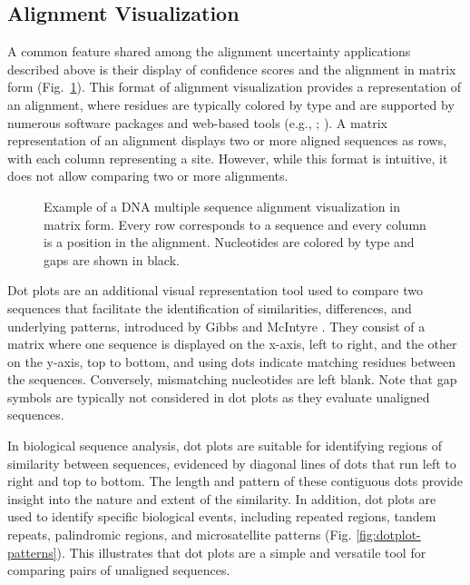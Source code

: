 \subsection{Alignment Visualization}

A common feature shared among the alignment uncertainty applications described above is their display of confidence scores and the alignment in matrix form (Fig.~\ref{fig:msa-example}). This format of alignment visualization provides a representation of an alignment, where residues are typically colored by type and are supported by numerous software packages and web-based tools (e.g., \citealp{zhou2022ggmsa}; \citealp{yachdav2016msaviewer}). A matrix representation of an alignment displays two or more aligned sequences as rows, with each column representing a site. However, while this format is intuitive, it does not allow comparing two or more alignments.

\begin{figure}[!ht]
    \centering
    
    \caption[Multiple Sequence Alignment Plot]{Example of a DNA multiple sequence alignment visualization in matrix form. Every row corresponds to a sequence and every column is a position in the alignment. Nucleotides are colored by type and gaps are shown in black.}
    \label{fig:msa-example}
\end{figure}

Dot plots are an additional visual representation tool used to compare two sequences that facilitate the identification of similarities, differences, and underlying patterns, introduced by Gibbs and McIntyre \citeyearpar{gibbs1970dotplot}. They consist of a matrix where one sequence is displayed on the x-axis, left to right, and the other on the y-axis, top to bottom, and using dots indicate matching residues between the sequences. Conversely, mismatching nucleotides are left blank. Note that gap symbols are typically not considered in dot plots as they evaluate unaligned sequences.

In biological sequence analysis, dot plots are suitable for identifying regions of similarity between sequences, evidenced by diagonal lines of dots that run left to right and top to bottom. The length and pattern of these contiguous dots provide insight into the nature and extent of the similarity. In addition, dot plots are used to identify specific biological events, including repeated regions, tandem repeats, palindromic regions, and microsatellite patterns (Fig. \ref{fig:dotplot-patterns}). This illustrates that dot plots are a simple and versatile tool for comparing pairs of unaligned sequences.


